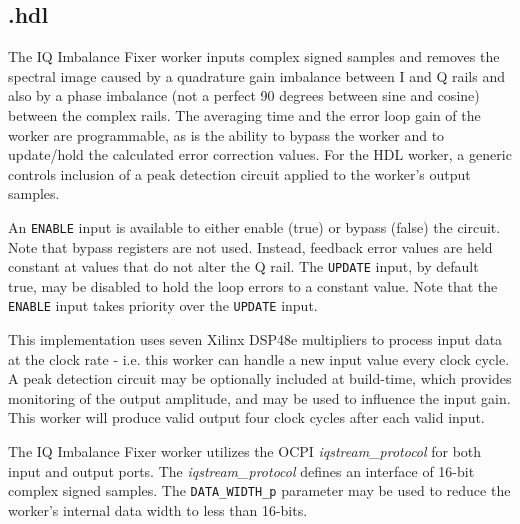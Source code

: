 \subsection*{\comp.hdl}
\begin{flushleft}
	The IQ Imbalance Fixer worker inputs complex signed samples and removes the spectral image caused by a quadrature gain imbalance between I and Q rails and also by a phase imbalance (not a perfect 90 degrees between sine and cosine) between the complex rails. The averaging time and the error loop gain of the worker are programmable, as is the ability to bypass the worker and to update/hold the calculated error correction values. For the HDL worker, a generic controls inclusion of a peak detection circuit applied to the worker's output samples.\medskip

	An \verb+ENABLE+ input is available to either enable (true) or bypass (false) the circuit. Note that bypass registers are not used. Instead, feedback error values are held constant at values that do not alter the Q rail. The \verb+UPDATE+ input, by default true, may be disabled to hold the loop errors to a constant value. Note that the \verb+ENABLE+ input takes priority over the \verb+UPDATE+ input.\medskip

	This implementation uses seven Xilinx DSP48e multipliers to process input data at the clock rate - i.e. this worker can handle a new input value every clock cycle. A peak detection circuit may be optionally included at build-time, which provides monitoring of the output amplitude, and may be used to influence the input gain. This worker will produce valid output four clock cycles after each valid input.\medskip

	The IQ Imbalance Fixer worker utilizes the OCPI \textit{iqstream\_protocol} for both input and output ports. The \textit{iqstream\_protocol} defines an interface of 16-bit complex signed samples. The \verb+DATA_WIDTH_p+ parameter may be used to reduce the worker's internal data width to less than 16-bits.
\end{flushleft}

